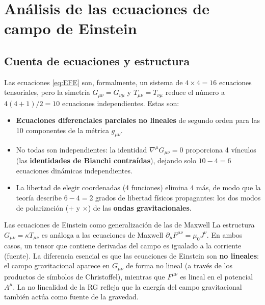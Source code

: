 \section{Análisis de las ecuaciones de campo de Einstein}
\label{sec:analisis_EFE}

\subsection{Cuenta de ecuaciones y estructura}

Las ecuaciones \eqref{eq:EFE} son, formalmente, un sistema de $4\times 4 = 16$ ecuaciones tensoriales, pero la simetría $G_{\mu\nu} = G_{\nu\mu}$ y $T_{\mu\nu} = T_{\nu\mu}$ reduce el número a $4(4+1)/2 = 10$ ecuaciones independientes. Estas son:
\begin{itemize}[leftmargin=2em]
  \item \textbf{Ecuaciones diferenciales parciales no lineales} de segundo orden para las 10 componentes de la métrica $g_{\mu\nu}$.
  \item No todas son independientes: la identidad $\nabla^\mu G_{\mu\nu} = 0$ proporciona 4 vínculos (las \textbf{identidades de Bianchi contraídas}), dejando solo $10 - 4 = 6$ ecuaciones dinámicas independientes.
  \item La libertad de elegir coordenadas (4 funciones) elimina 4 más, de modo que la teoría describe $6 - 4 = 2$ grados de libertad físicos propagantes: los dos modos de polarización ($+$ y $\times$) de las \textbf{ondas gravitacionales}.
\end{itemize}

\begin{observacion}{Las ecuaciones de Einstein como generalización de las de Maxwell}{}
La estructura $G_{\mu\nu} = \kappa T_{\mu\nu}$ es análoga a las ecuaciones de Maxwell $\partial_\mu F^{\mu\nu} = \mu_0 J^\nu$. En ambos casos, un tensor que contiene derivadas del campo es igualado a la corriente (fuente). La diferencia esencial es que las ecuaciones de Einstein son \textbf{no lineales}: el campo gravitacional aparece en $G_{\mu\nu}$ de forma no lineal (a través de los productos de símbolos de Christoffel), mientras que $F^{\mu\nu}$ es lineal en el potencial $A^\mu$. La no linealidad de la RG refleja que la energía del campo gravitacional también actúa como fuente de la gravedad.
\end{observacion}

